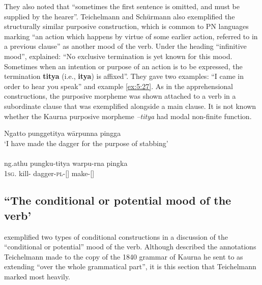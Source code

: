 They also noted that “sometimes the first sentence is omitted, and must be supplied by the hearer”.
Teichelmann and Schürmann also exemplified the structurally similar purposive construction, which is common to PN languages marking “an action which happens by virtue of some earlier action, referred to in a previous clause” \citep[71]{dixon_preface_2002} as another mood of the verb. Under the heading ``infinitive mood'', \citet[19]{teichelmann_outlines_1840} explained: “No exclusive termination is yet known for this mood. Sometimes when an intention or purpose of an action is to be expressed, the termination \textbf{titya} (i.e., \textbf{itya}) is affixed”. They gave two examples: “I came in order to hear you speak” and example \ref{ex:5:27}. As in the apprehensional constructions, the purposive morpheme was shown attached to a verb in a subordinate clause that was exemplified alongside a main clause. It is not known whether the Kaurna purposive morpheme \textit{–titya} had modal non-finite function. 

\ea\label{ex:5:27}
Ngatto       punggetitya     wārpunna               pingga \\
\glt `I have made the dagger for the purpose of stabbing' \\
\citep[20]{teichelmann_outlines_1840} \\
\gll ng.athu    pungku-titya	warpu-rna	 pingka  \\
   1\textsc{sg}.     kill-  	dagger-\textsc{pl}-[]   make-[]                              \\
\z




\subsection{“The conditional or potential mood of the verb’}
\label{sec:key:5.6.2}

\citet[19]{teichelmann_outlines_1840} exemplified two types of conditional constructions in a discussion of the “conditional or potential” mood of the verb. Although \citet[40]{bleek_library_1858} described the annotations Teichelmann made to the copy of the 1840 grammar of Kaurna he sent to \citet{teichelmann_verb_1858} as extending “over the whole grammatical part”, it is this section that Teichelmann marked most heavily. 

